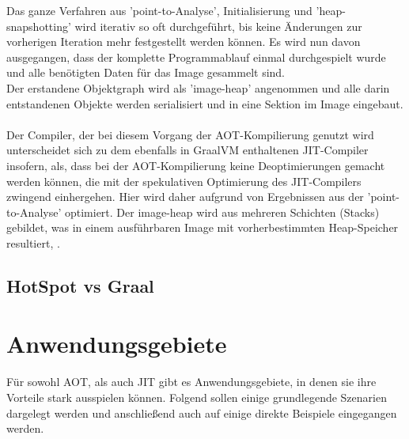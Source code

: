 Das ganze Verfahren aus 'point-to-Analyse', Initialisierung und 'heap-snapshotting' wird iterativ so oft durchgeführt, bis keine Änderungen zur vorherigen Iteration mehr festgestellt werden können. Es wird nun davon ausgegangen, dass der komplette Programmablauf einmal durchgespielt wurde und alle benötigten Daten für das Image gesammelt sind.\\
Der erstandene Objektgraph wird als 'image-heap' angenommen und alle darin entstandenen Objekte werden serialisiert und in eine Sektion im Image eingebaut. \\
\\
Der Compiler, der bei diesem Vorgang der \ac{AOT}-Kompilierung genutzt wird unterscheidet sich zu dem ebenfalls in GraalVM enthaltenen \ac{JIT}-Compiler insofern, als, dass bei der \ac{AOT}-Kompilierung keine Deoptimierungen gemacht werden können, die mit der spekulativen Optimierung des \ac{JIT}-Compilers zwingend einhergehen. Hier wird daher aufgrund von Ergebnissen aus der 'point-to-Analyse' optimiert. Der image-heap wird aus mehreren Schichten (Stacks) gebildet, was in einem ausführbaren Image mit vorherbestimmten Heap-Speicher resultiert, \cite[vgl. Sipek 2020, S.3]{Sipek_2020}.

\subsection{HotSpot vs Graal}

\section{Anwendungsgebiete}
Für sowohl \ac{AOT}, als auch \ac{JIT} gibt es Anwendungsgebiete, in denen sie ihre Vorteile stark ausspielen können. Folgend sollen einige grundlegende Szenarien dargelegt werden und anschließend auch auf einige direkte Beispiele eingegangen werden.
